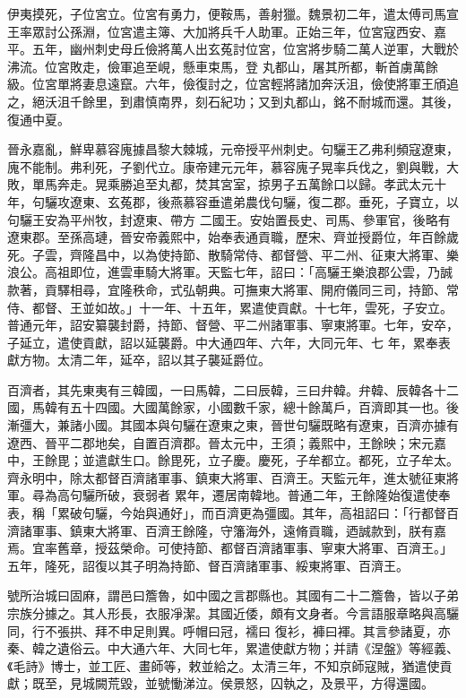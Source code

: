 \begin{pinyinscope}
 伊夷摸死，子位宮立。位宮有勇力，便鞍馬，善射獵。魏景初二年，遣太傅司馬宣王率眾討公孫淵，位宮遣主簿、大加將兵千人助軍。正始三年，位宮寇西安、嘉平。五年，幽州刺史母丘儉將萬人出玄菟討位宮，位宮將步騎二萬人逆軍，大戰於沸流。位宮敗走，儉軍追至峴，懸車束馬，登
 丸都山，屠其所都，斬首虜萬餘級。位宮單將妻息遠竄。六年，儉復討之，位宮輕將諸加奔沃沮，儉使將軍王頎追之，絕沃沮千餘里，到肅慎南界，刻石紀功；又到丸都山，銘不耐城而還。其後，復通中夏。



 晉永嘉亂，鮮卑慕容廆據昌黎大棘城，元帝授平州刺史。句驪王乙弗利頻寇遼東，廆不能制。弗利死，子劉代立。康帝建元元年，慕容廆子晃率兵伐之，劉與戰，大敗，單馬奔走。晃乘勝追至丸都，焚其宮室，掠男子五萬餘口以歸。孝武太元十年，句驪攻遼東、玄菟郡，後燕慕容垂遣弟農伐句驪，復二郡。垂死，子寶立，以句驪王安為平州牧，封遼東、帶方
 二國王。安始置長史、司馬、參軍官，後略有遼東郡。至孫高璉，晉安帝義熙中，始奉表通貢職，歷宋、齊並授爵位，年百餘歲死。子雲，齊隆昌中，以為使持節、散騎常侍、都督營、平二州、征東大將軍、樂浪公。高祖即位，進雲車騎大將軍。天監七年，詔曰：「高驪王樂浪郡公雲，乃誠款著，貢驛相尋，宜隆秩命，式弘朝典。可撫東大將軍、開府儀同三司，持節、常侍、都督、王並如故。」十一年、十五年，累遣使貢獻。十七年，雲死，子安立。普通元年，詔安纂襲封爵，持節、督營、平二州諸軍事、寧東將軍。七年，安卒，子延立，遣使貢獻，詔以延襲爵。中大通四年、六年，大同元年、七
 年，累奉表獻方物。太清二年，延卒，詔以其子襲延爵位。



 百濟者，其先東夷有三韓國，一曰馬韓，二曰辰韓，三曰弁韓。弁韓、辰韓各十二國，馬韓有五十四國。大國萬餘家，小國數千家，總十餘萬戶，百濟即其一也。後漸彊大，兼諸小國。其國本與句驪在遼東之東，晉世句驪既略有遼東，百濟亦據有遼西、晉平二郡地矣，自置百濟郡。晉太元中，王須；義熙中，王餘映；宋元嘉中，王餘毘；並遣獻生口。餘毘死，立子慶。慶死，子牟都立。都死，立子牟太。齊永明中，除太都督百濟諸軍事、鎮東大將軍、百濟王。天監元年，進太號征東將軍。尋為高句驪所破，衰弱者
 累年，遷居南韓地。普通二年，王餘隆始復遣使奉表，稱「累破句驪，今始與通好」，而百濟更為彊國。其年，高祖詔曰：「行都督百濟諸軍事、鎮東大將軍、百濟王餘隆，守籓海外，遠脩貢職，迺誠款到，朕有嘉焉。宜率舊章，授茲榮命。可使持節、都督百濟諸軍事、寧東大將軍、百濟王。」五年，隆死，詔復以其子明為持節、督百濟諸軍事、綏東將軍、百濟王。



 號所治城曰固麻，謂邑曰簷魯，如中國之言郡縣也。其國有二十二簷魯，皆以子弟宗族分據之。其人形長，衣服凈潔。其國近倭，頗有文身者。今言語服章略與高驪同，行不張拱、拜不申足則異。呼帽曰冠，襦曰
 復衫，褲曰褌。其言參諸夏，亦秦、韓之遺俗云。中大通六年、大同七年，累遣使獻方物；并請《涅盤》等經義、《毛詩》博士，並工匠、畫師等，敕並給之。太清三年，不知京師寇賊，猶遣使貢獻；既至，見城闕荒毀，並號慟涕泣。侯景怒，囚執之，及景平，方得還國。




\end{pinyinscope}
